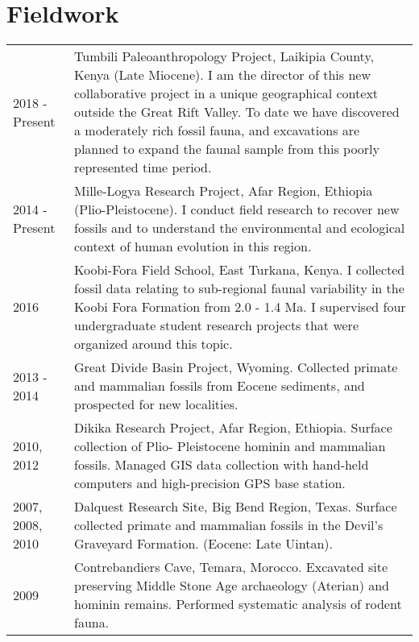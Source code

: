 \documentclass{article}
\begin{document}
\section*{Fieldwork }
\begin{longtable}{p{}p{}}

2018 - Present & Tumbili Paleoanthropology Project, Laikipia County, Kenya (Late Miocene). I am the director of this new collaborative project in a unique geographical context outside the Great Rift Valley. To date we have discovered a moderately rich fossil fauna, and excavations are planned to expand the faunal sample from this poorly represented time period.\\[4pt]

2014 - Present & Mille-Logya Research Project, Afar Region, Ethiopia (Plio-Pleistocene). I conduct field research to recover new fossils and to understand the environmental and ecological context of human evolution in this region. \\[4pt]

2016 & Koobi-Fora Field School, East Turkana, Kenya. I collected fossil data relating to sub-regional faunal variability in the Koobi Fora Formation from 2.0 - 1.4 Ma. I supervised four undergraduate student research projects that were organized around this topic. \\[4pt]


2013 - 2014 & Great Divide Basin Project, Wyoming. Collected primate and mammalian fossils from Eocene sediments, and prospected for new localities. \\[4pt]

2010, 2012 & Dikika Research Project, Afar Region, Ethiopia. Surface collection of Plio- Pleistocene hominin and mammalian fossils. Managed GIS data collection with hand-held computers and high-precision GPS base station.\\[4pt]

2007, 2008, 2010 & Dalquest Research Site, Big Bend Region, Texas. Surface collected primate and mammalian fossils in the Devil's Graveyard Formation. (Eocene: Late Uintan).\\[4pt]

2009 & Contrebandiers Cave, Temara, Morocco.  Excavated site preserving Middle Stone Age archaeology (Aterian) and hominin remains. Performed systematic analysis of rodent fauna.\\
\end{longtable}
\end{document}
